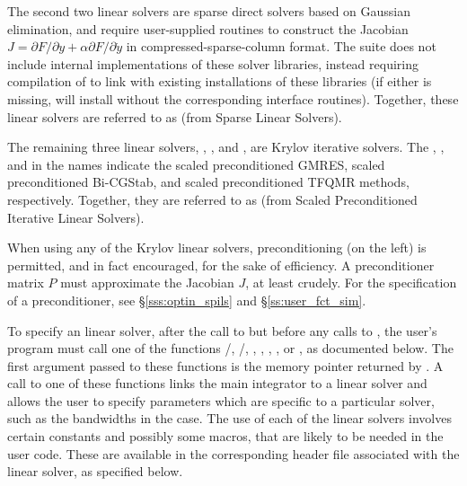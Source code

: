 The second two linear solvers are sparse direct solvers based on
Gaussian elimination, and require user-supplied routines to construct
the Jacobian $J = \partial{F}/\partial{y} + \alpha
\partial{F}/\partial{\dot{y}}$ in compressed-sparse-column format. The
{\sundials} suite does not include internal implementations of these
solver libraries, instead requiring compilation of {\sundials} to link
with existing installations of these libraries (if either is missing,
{\sundials} will install without the corresponding interface
routines).  Together, these linear solvers are referred to as {\cvsls}
(from Sparse Linear Solvers). 

The remaining three {\idas} linear solvers, {\idaspgmr}, {\idaspbcg},
and {\idasptfqmr}, are Krylov iterative solvers. The {\spgmr}, {\spbcg}, and
{\sptfqmr} in the names indicate the scaled preconditioned GMRES, scaled
preconditioned Bi-CGStab, and scaled preconditioned TFQMR methods, respectively.
Together, they are referred to as {\idaspils} (from Scaled Preconditioned 
Iterative Linear Solvers).

When using any of the Krylov linear solvers, preconditioning (on the left)
is permitted, and in fact encouraged, for the sake of efficiency.
A preconditioner matrix $P$ must approximate the Jacobian $J$, at least
crudely.  For the specification of a preconditioner, see \S\ref{sss:optin_spils}
and \S\ref{ss:user_fct_sim}.

To specify an {\idas} linear solver, after the call to  but
before any calls to , the user's program must call one of the
functions /, /,
, , , , or
, as documented below. 
The first argument passed to these functions
is the {\idas} memory pointer returned by .  A call to one of these
functions links the main {\idas} integrator to a linear solver and
allows the user to specify parameters which are specific to a
particular solver, such as the bandwidths in the {\idaband} case.
The use of each of the linear solvers involves certain constants and possibly 
some macros, that are likely to be needed in the user code.  These are
available in the corresponding header file associated with the linear
solver, as specified below.

